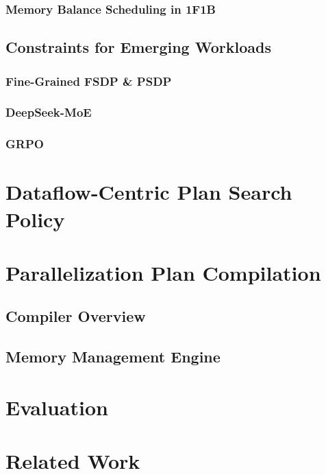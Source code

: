 \subsubsection{Memory Balance Scheduling in 1F1B}


\subsection{Constraints for Emerging Workloads}
\label{sec:new_constraints}

\subsubsection{Fine-Grained FSDP \& PSDP}

\subsubsection{DeepSeek-MoE}

\subsubsection{GRPO}


\section{Dataflow-Centric Plan Search Policy}
\label{sec:search}


\section{Parallelization Plan Compilation}
\label{sec:compiler}

\subsection{Compiler Overview}

\subsection{Memory Management Engine}


\section{Evaluation}
\label{sec:exp}


\section{Related Work}
\label{sec:related_work}

